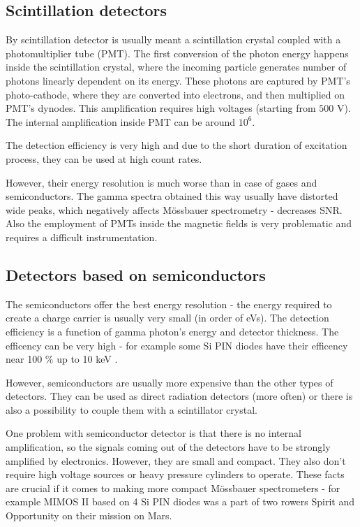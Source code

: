 \subsection{Scintillation detectors}
By scintillation detector is usually meant a scintillation crystal coupled with a photomultiplier tube (PMT). The first conversion of the photon energy happens inside the scintillation crystal, where the incoming particle generates number of photons linearly dependent on its energy. These photons are captured by PMT's photo-cathode, where they are converted into electrons, and then multiplied on PMT's dynodes. This amplification requires high voltages (starting from $500$ V). The internal amplification inside PMT can be around $10^6$.
\par
The detection efficiency is very high and due to the short duration of excitation process, they can be used at high count rates.
\par
However, their energy resolution is much worse than in case of gases and semiconductors. The gamma spectra obtained this way usually have distorted wide peaks, which negatively affects Mössbauer spectrometry - decreases SNR. Also the employment of PMTs inside the magnetic fields is very problematic and requires a difficult instrumentation. 


\subsection{Detectors based on semiconductors}
The semiconductors offer the best energy resolution - the energy required to create a charge carrier is usually very small (in order of eVs). The detection efficiency is a function of gamma photon's energy and detector thickness. The efficency can be very high - for example some Si PIN diodes have their efficency near 100 $\%$ up to 10 keV \cite{SiCdTe}.

However, semiconductors are usually more expensive than the other types of detectors. They can be used as direct radiation detectors (more often) or there is also a possibility to couple them with a scintillator crystal.
\par
One problem with semiconductor detector is that there is no internal amplification, so the signals coming out of the detectors have to be strongly amplified by electronics.
However, they are small and compact. They also don't require high voltage sources or heavy pressure cylinders to operate. These facts are crucial if it comes to making more compact Mössbauer spectrometers - for example MIMOS II \cite{https://doi.org/10.1029/2003JE002138} based on 4 Si PIN diodes was a part of two rowers Spirit and Opportunity on their mission on Mars. 




